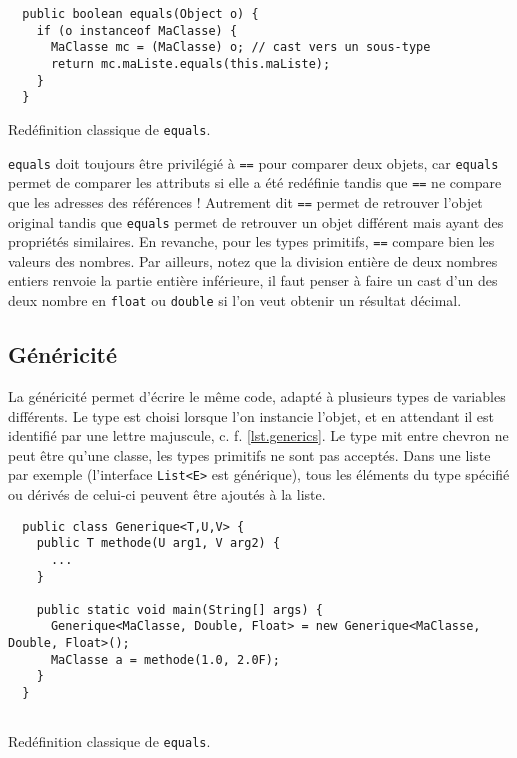 \documentclass[10pt]{article}
\begin{document}
\begin{listing}[h!]
\begin{verbatim}
  public boolean equals(Object o) {
    if (o instanceof MaClasse) {
      MaClasse mc = (MaClasse) o; // cast vers un sous-type
      return mc.maListe.equals(this.maListe);
    }
  }
\end{verbatim}
\caption{Redéfinition classique de \texttt{equals}.
\label{lst.equals}}
\end{listing}

\texttt{equals} doit toujours être privilégié à \verb!==! pour comparer deux objets, car \texttt{equals} permet
de comparer les attributs si elle a été redéfinie tandis que \verb!==! ne compare que les adresses des références !
Autrement dit \verb!==! permet de retrouver l'objet original tandis que \texttt{equals} permet de retrouver un
objet différent mais ayant des propriétés similaires.
En revanche, pour les types primitifs, \verb!==! compare bien les valeurs des nombres. Par ailleurs, notez que la division entière
de deux nombres entiers renvoie la partie entière inférieure, il faut penser à faire un cast d'un des deux nombre en \texttt{float}
ou \texttt{double} si l'on veut obtenir un résultat décimal.



\subsection{Généricité}

La généricité permet d'écrire le même code, adapté à plusieurs types de variables différents.
Le type est choisi lorsque l'on instancie l'objet, et en attendant il est identifié par une
lettre majuscule, c. f. \cref{lst.generics}. Le type mit entre chevron ne peut être qu'une classe,
les types primitifs ne sont pas acceptés.
Dans une liste par exemple (l'interface \texttt{List<E>} est générique),
tous les éléments du type spécifié ou dérivés de celui-ci peuvent être ajoutés à la liste.

\begin{listing}[h!]
\begin{verbatim}
  public class Generique<T,U,V> {
    public T methode(U arg1, V arg2) {
      ...
    }

    public static void main(String[] args) {
      Generique<MaClasse, Double, Float> = new Generique<MaClasse, Double, Float>();
      MaClasse a = methode(1.0, 2.0F);
    }
  }
  
\end{verbatim}
\caption{Redéfinition classique de \texttt{equals}.
\label{lst.generics}}
\end{listing}
\end{document}
